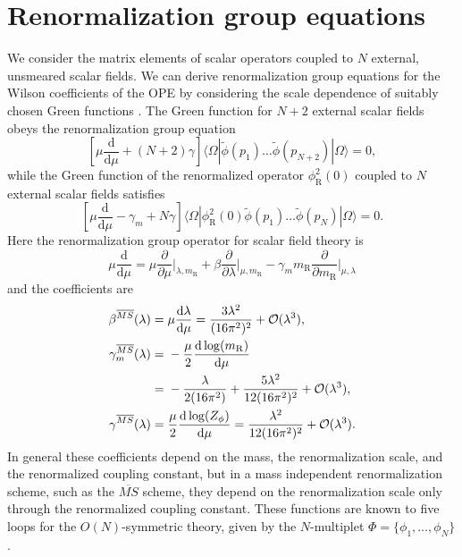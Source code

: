 \section{\label{sec:rgeqns}Renormalization group equations}

We consider the matrix elements of scalar operators coupled to 
$N$ external, unsmeared scalar fields. We can derive renormalization group 
equations 
for the Wilson coefficients of the OPE by considering the scale dependence of 
suitably chosen Green functions \cite{Collins:1984rdg}. The Green function for 
$N+2$ external scalar 
fields obeys the renormalization group equation
\begin{equation}\label{eq:rg1}
\left[\mu\frac{\mathrm{d}}{\mathrm{d} \mu}+\left(N+2\right)\gamma 
\right]\big\langle \Omega |  
\widetilde{\phi}(p_1) \ldots\widetilde{\phi}(p_{N+2}) | \Omega \big\rangle = 0,
\end{equation}
while the Green function of the renormalized operator $\phi_{\mathrm{R}}^2(0)$ 
coupled 
to $N$ external scalar fields satisfies
\begin{equation}\label{eq:rg2}
\left[\mu\frac{\mathrm{d}}{\mathrm{d} \mu}-\gamma_m + N\gamma
\right]\big\langle \Omega |  \phi_{\mathrm{R}}^2(0)
\widetilde{\phi}(p_1) \ldots\widetilde{\phi}(p_N) | \Omega \big\rangle = 0.
\end{equation}
Here the renormalization group operator for scalar field theory is
\begin{equation}
\mu\frac{\mathrm{d}}{\mathrm{d} \mu} = \mu\frac{\partial}{\partial 
\mu}\bigg|_{\lambda,m_{\mathrm{R}}} + \beta 
\frac{\partial}{\partial \lambda}\bigg|_{\mu,m_{\mathrm{R}}} - \gamma_m 
m_{\mathrm{R}}\frac{\partial}{\partial m_{\mathrm{R}}}\bigg|_{\mu,\lambda}
\end{equation}
and the coefficients are \cite{Kleinert:2001ax}
\begin{align}
\beta^{\overline{MS}}(\lambda) = {} & \mu 
\frac{\mathrm{d}\lambda}{\mathrm{d}\mu} 
=\frac{3\lambda^2}{(16\pi^2)^2}+{\cal O}(\lambda^3), \\
\gamma_m^{\overline{MS}}(\lambda) = {} & 
-\frac{\mu}{2}\frac{\mathrm{d}\log(m_{\mathrm{R}})}{\mathrm{d}\mu}
\nonumber \\
= {} &  -\frac{\lambda}{2(16\pi^2)}+
\frac{5\lambda^2}{12(16\pi^2)^2}+{\cal O}(\lambda^3), \label{eq:gammam}\\
\gamma^{\overline{MS}}(\lambda) = {} & \frac{\mu}{2} 
\frac{\mathrm{d}\log(Z_\phi)}{\mathrm{d}\mu} 
=  \frac{\lambda^2}{12(16\pi^2)^2}+{\cal O}(\lambda^3).
\end{align}
In general these coefficients depend on the mass, the renormalization scale, 
and 
the renormalized coupling constant, but in a mass independent renormalization 
scheme, such as the $\overline{MS}$ scheme, they depend on the 
renormalization scale only through the renormalized coupling constant. These 
functions are known to five loops for the $O(N)$-symmetric theory, given by the 
$N$-multiplet $\Phi = \{\phi_1,\ldots,\phi_N\}$ 
\cite{Derkachov:1997pf,Kleinert:2001ax}.

